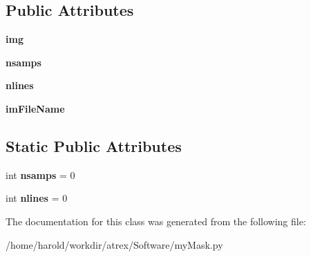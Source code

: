 \subsection*{Public Attributes}
\begin{DoxyCompactItemize}
\item 
\hypertarget{classmyMask_1_1myMask_abc71579b1017e1a3d98fdca371e771fd}{{\bfseries img}}\label{classmyMask_1_1myMask_abc71579b1017e1a3d98fdca371e771fd}

\item 
\hypertarget{classmyMask_1_1myMask_aec05f7b9af1f9ba5b283f1034f229cdc}{{\bfseries nsamps}}\label{classmyMask_1_1myMask_aec05f7b9af1f9ba5b283f1034f229cdc}

\item 
\hypertarget{classmyMask_1_1myMask_a580ea0a4ec202bbc76ac0ad31b3d9f2b}{{\bfseries nlines}}\label{classmyMask_1_1myMask_a580ea0a4ec202bbc76ac0ad31b3d9f2b}

\item 
\hypertarget{classmyMask_1_1myMask_a70decb30e8747e2688e1840f253f3950}{{\bfseries im\-File\-Name}}\label{classmyMask_1_1myMask_a70decb30e8747e2688e1840f253f3950}

\end{DoxyCompactItemize}
\subsection*{Static Public Attributes}
\begin{DoxyCompactItemize}
\item 
\hypertarget{classmyMask_1_1myMask_a6a94c13fe022b092f42d5be3f3b29fe6}{int {\bfseries nsamps} = 0}\label{classmyMask_1_1myMask_a6a94c13fe022b092f42d5be3f3b29fe6}

\item 
\hypertarget{classmyMask_1_1myMask_a91b9f3c41dd6f0c54860b24069f56ca4}{int {\bfseries nlines} = 0}\label{classmyMask_1_1myMask_a91b9f3c41dd6f0c54860b24069f56ca4}

\end{DoxyCompactItemize}


The documentation for this class was generated from the following file\-:\begin{DoxyCompactItemize}
\item 
/home/harold/workdir/atrex/\-Software/my\-Mask.\-py\end{DoxyCompactItemize}
